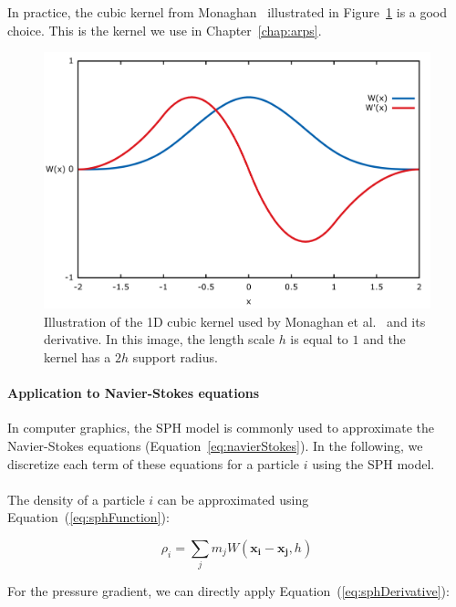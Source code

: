 In practice, the cubic kernel from Monaghan~\cite{Monaghan1992} illustrated in Figure~\ref{fig:cubicKernel} is a good choice.
This is the kernel we use in Chapter~\ref{chap:arps}.

\begin{figure}[!ht]
	\centering
	\includegraphics[scale=0.6]{images/continuum_mechanics/cubicKernel.png}
	\caption[STAR mechanics: Cubic kernel]{\label{fig:cubicKernel}
		Illustration of the 1D cubic kernel used by Monaghan et al.~\cite{Monaghan1992} and its derivative.
    In this image, the length scale $h$ is equal to $1$ and the kernel has a $2h$ support radius.}
\end{figure}

\paragraph{Application to Navier-Stokes equations}

In computer graphics, the SPH model is commonly used to approximate the Navier-Stokes equations (Equation~\ref{eq:navierStokes}).
In the following, we discretize each term of these equations for a particle $i$ using the SPH model.
\\ \\
The density of a particle $i$ can be approximated using Equation~(\ref{eq:sphFunction}):

\begin{equation}
\label{eq:densitySPH}
\rho_{i} = \sum_{j} m_{j}W(\mathbf{x_{i}}-\mathbf{x_{j}},h)
\end{equation}

For the pressure gradient, we can directly apply Equation~(\ref{eq:sphDerivative}):

